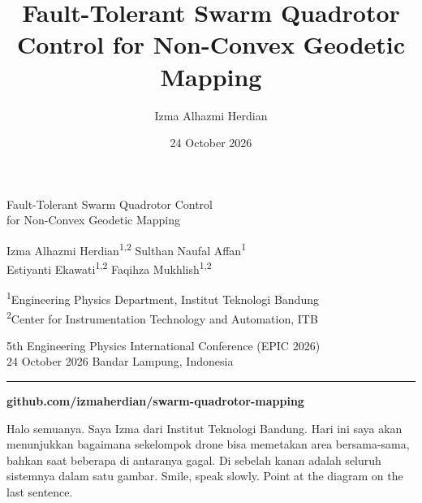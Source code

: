 \documentclass[aspectratio=169,11pt,t]{beamer}
\title{Fault-Tolerant Swarm Quadrotor Control for Non-Convex Geodetic Mapping}
\author{Izma Alhazmi Herdian}
\date{24 October 2026}
\begin{document}
{
\begin{frame}[plain]
  \vskip4mm
  \begin{minipage}{0.92\linewidth}
    {\color{epicwhite}\headfont\fontsize{19}{23}\selectfont
     Fault-Tolerant Swarm Quadrotor Control\\for Non-Convex Geodetic Mapping\par}
  \end{minipage}
  \vskip16mm
  {\color{epicrust}\headfont\small
   Izma Alhazmi Herdian\textsuperscript{1,2}\quad
   Sulthan Naufal Affan\textsuperscript{1}\\[0.6ex]
   Estiyanti Ekawati\textsuperscript{1,2}\quad
   Faqihza Mukhlish\textsuperscript{1,2}\par}
  \vskip2.5mm
  {\color{epicbody}\small
   \textsuperscript{1}Engineering Physics Department, Institut Teknologi Bandung\\
   \textsuperscript{2}Center for Instrumentation Technology and Automation, ITB\par}
  \vskip6mm
  {\color{epicmuted}\small
   5th Engineering Physics International Conference (EPIC 2026)\\
   24 October 2026 \textperiodcentered{} Bandar Lampung, Indonesia\par}
  \vfill
  {\color{epicrule}\rule{\linewidth}{0.4pt}\par}
  \vskip1.5mm
  {\color{epicclay}\bfseries\small github.com/izmaherdian/swarm-quadrotor-mapping\par}
    {Halo semuanya. Saya Izma dari Institut Teknologi Bandung. Hari ini saya akan menunjukkan bagaimana sekelompok drone bisa memetakan area bersama-sama, bahkan saat beberapa di antaranya gagal. Di sebelah kanan adalah seluruh sistemnya dalam satu gambar.}
    {Smile, speak slowly. Point at the diagram on the last sentence.}
\end{frame}}
\end{document}
